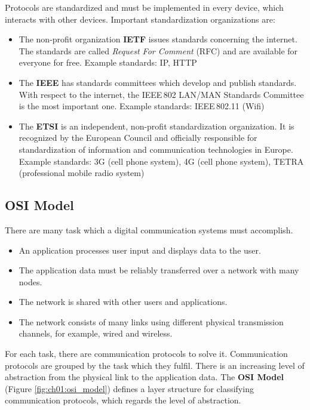 \begin{refsection}
Protocols are standardized and must be implemented in every device, which interacts with other devices. Important standardization organizations are:
\begin{itemize}
	\item The non-profit organization \textbf{\acf{IETF}} issues standards concerning the internet. The standards are called \emph{Request For Comment} (RFC) and are available for everyone for free. Example standards: \ac{IP}, \ac{HTTP}
	\item The \textbf{\acf{IEEE}} has standards committees which develop and publish standards. With respect to the internet, the IEEE\,802 LAN/MAN Standards Committee is the most important one. Example standards: IEEE\,802.11 (Wifi)
	\item The \textbf{\acf{ETSI}} is an independent, non-profit standardization organization. It is recognized by the European Council and officially responsible for standardization of information and communication technologies in Europe. Example standards: 3G (cell phone system), 4G (cell phone system), TETRA (professional mobile radio system)
\end{itemize}


\subsection{\acs{OSI} Model}

There are many task which a digital communication systems must accomplish.
\begin{itemize}
	\item An application processes user input and displays data to the user.
	\item The application data must be reliably transferred over a network with many nodes.
	\item The network is shared with other users and applications.
	\item The network consists of many links using different physical transmission channels, for example, wired and wireless.
\end{itemize}
For each task, there are communication protocols to solve it. Communication protocols are grouped by the task which they fulfil. There is an increasing level of abstraction from the physical link to the application data. The  \textbf{\acs{OSI} Model} (Figure \ref{fig:ch01:osi_model}) defines a layer structure for classifying communication protocols, which regards the level of abstraction.


\end{refsection}

